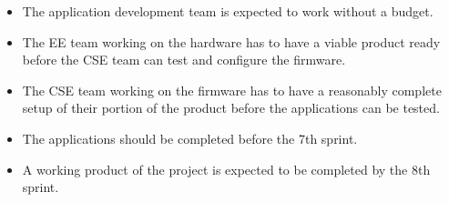 
\begin{itemize}
  \item The application development team is expected to work without a budget.

  \item The EE team working on the hardware has to have a viable product ready before the CSE team can test and configure the firmware.
  
  \item The CSE team working on the firmware has to have a reasonably complete setup of their portion of the product before the applications can be tested.

  \item The applications should be completed before the 7th sprint.

  \item A working product of the project is expected to be completed by the 8th sprint.

\end{itemize}
